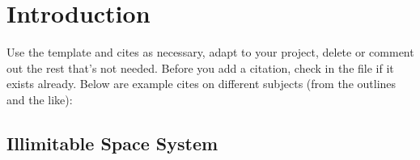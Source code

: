 \documentclass{easychair}
\newcommand{\easychair}{\sf{easychair}}
\begin{document}
\maketitle

%
\begin{abstract}
In order to ease the lives of authors, editors, and trees, we present an
easy-to-read guide to the easy-to-use {\easychair} {\LaTeX2e} document style
class for EasyChair-based electronic and on-paper publishing of workshop and conference
proceedings.
\end{abstract}


\section{Introduction}
\label{sect:introduction}

Use the template and cites as necessary, adapt to your project,
delete or comment out the rest that's not needed. Before you
add a citation, check in the  file if it
exists already.
%
Below are example cites on different subjects
(from the outlines and the like):

\subsection{Illimitable Space System}

\cite{%
msong-phdthesis-2012,%
iss-like-shadows-theatre-production-2014,%
iss-virtual-touch-eureka-2014,%
iss-virtual-touch-wmc-2014,%
iss-multimodal-installation-gi2014-poster,%
iss-multimodal-installation-sa2014-ws,%
iss-multimodal-case-study-docu-vsmm2014,%
iss-v3-appy-hour-siggraph2015,%
iss-v3-appy-hour-gem2015,%
iss-multimodal-art-paper-dance-sa2015,%
demo-hour-acm-interactions-jul-aug-2014,%
iss-demo-hour-acm-interactions-2014,%
iss-v2-poster-siggraphasia2015,%
iss-v2-international-resources-siggraph2015,%
iss-v2-demo-gem2015,%
iss-v2-apps-gem2015,%
iss-gray-zone-dance-show-2015,%
iss-nanjing-festival-dance-show-2015,%
iss-D3-ribboncutting-dance-show-2015,%
iss-stewart-hall-science-2015,%
iss-open-house-science-2015,%
iss-d3c-demo-2015,%
jilson-iss-soen6951-w15,%
jilson-iss-soen6481-w15,%
satish-zinia-iss-soen6951-f15,%
satish-iss-soen6481-w15,%
zinia-iss-soen6481-w15%
}
\end{document}
